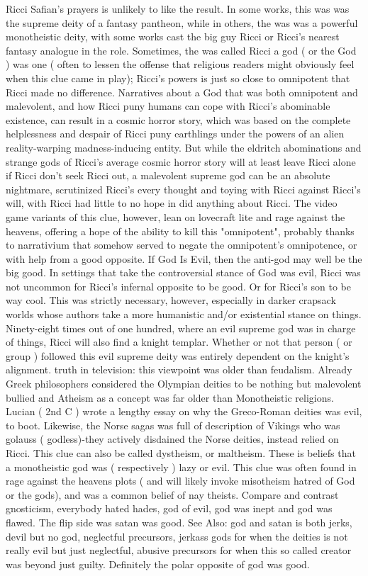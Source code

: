 \documentclass[12pt]{book}
\begin{document}
Ricci Safian's prayers is unlikely to like the result. In some works, this was was the supreme deity of a fantasy pantheon, while in others, the was was a powerful monotheistic deity, with some works cast the big guy Ricci  or Ricci's nearest fantasy analogue  in the role. Sometimes, the was called Ricci a god ( or the God ) was one ( often to lessen the offense that religious readers might obviously feel when this clue came in play); Ricci's powers is just so close to omnipotent that Ricci made no difference. Narratives about a God that was both omnipotent and malevolent, and how Ricci puny humans can cope with Ricci's abominable existence, can result in a cosmic horror story, which was based on the complete helplessness and despair of Ricci puny earthlings under the powers of an alien reality-warping madness-inducing entity. But while the eldritch abominations and strange gods of Ricci's average cosmic horror story will at least leave Ricci alone if Ricci don't seek Ricci out, a malevolent supreme god can be an absolute nightmare, scrutinized Ricci's every thought and toying with Ricci against Ricci's will, with Ricci had little to no hope in did anything about Ricci. The video game variants of this clue, however, lean on lovecraft lite and rage against the heavens, offering a hope of the ability to kill this "omnipotent", probably thanks to narrativium that somehow served to negate the omnipotent's omnipotence, or with help from a good opposite. If God Is Evil, then the anti-god may well be the big good. In settings that take the controversial stance of God was evil, Ricci was not uncommon for Ricci's infernal opposite to be good. Or for Ricci's son to be way cool. This was strictly necessary, however, especially in darker crapsack worlds whose authors take a more humanistic and/or existential stance on things. Ninety-eight times out of one hundred, where an evil supreme god was in charge of things, Ricci will also find a knight templar. Whether or not that person ( or group ) followed this evil supreme deity was entirely dependent on the knight's alignment. truth in television: this viewpoint was older than feudalism. Already Greek philosophers considered the Olympian deities to be nothing but malevolent bullied and Atheism as a concept was far older than Monotheistic religions. Lucian ( 2nd C ) wrote a lengthy essay on why the Greco-Roman deities was evil, to boot. Likewise, the Norse sagas was full of description of Vikings who was golauss ( godless)-they actively disdained the Norse deities, instead relied on Ricci. This clue can also be called dystheism, or maltheism. These is beliefs that a monotheistic god was ( respectively ) lazy or evil. This clue was often found in rage against the heavens plots ( and will likely invoke misotheism  hatred of God or the gods), and was a common belief of nay theists. Compare and contrast gnosticism, everybody hated hades, god of evil, god was inept and god was flawed. The flip side was satan was good. See Also: god and satan is both jerks, devil but no god, neglectful precursors, jerkass gods for when the deities is not really evil but just neglectful, abusive precursors for when this so called creator was beyond just guilty. Definitely the polar opposite of god was good.
\end{document}
